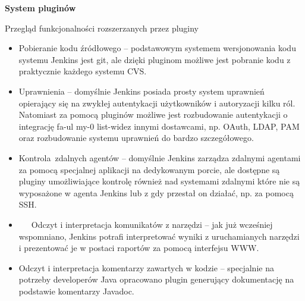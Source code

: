 \documentclass[12pt]{article}
\renewcommand{\_}{\kern-1.5pt\textunderscore\kern-1.5pt}
\begin{document}
\begin{adjustwidth}{1.0in}{0.0in}
{\fontsize{13pt}{15.6pt}\selectfont \textbf{System pluginów}\par}\par

\end{adjustwidth}

\begin{adjustwidth}{1.0in}{0.0in}
Przegląd funkcjonalności rozszerzanych przez pluginy\par

\end{adjustwidth}


\vspace{\baselineskip}
\begin{itemize}
	\item Pobieranie kodu źródłowego – podstawowym systemem wersjonowania kodu systemu Jenkins jest git, ale dzięki pluginom możliwe jest pobranie kodu z praktycznie każdego systemu CVS.\par

	\item  Uprawnienia – domyślnie Jenkins posiada prosty system uprawnień opierający się na zwykłej autentykacji użytkowników i autoryzacji kilku ról. Natomiast za pomocą pluginów możliwe jest rozbudowanie autentykacji o integrację fa-ul my-0 list-widez innymi dostawcami, np. OAuth, LDAP, PAM oraz rozbudowanie systemu uprawnień do bardzo szczegółowego.\par

	\item Kontrola\ zdalnych agentów – domyślnie Jenkins zarządza zdalnymi agentami za pomocą specjalnej aplikacji na dedykowanym porcie, ale dostępne są pluginy umożliwiające kontrolę również nad systemami zdalnymi które nie są wyposażone w agenta Jenkins lub z gdy przestał on działać, np. za pomocą SSH.  \par

	\item \ \ \  Odczyt i interpretacja komunikatów z narzędzi – jak już wcześniej wspomniano, Jenkins potrafi interpretować wyniki z uruchamianych narzędzi i prezentować je w postaci raportów za pomocą interfejsu WWW.\par

	\item Odczyt i interpretacja komentarzy zawartych w kodzie – specjalnie na potrzeby developerów Java opracowano plugin generujący dokumentację na podstawie komentarzy Javadoc.\par


\end{itemize}
\end{document}
